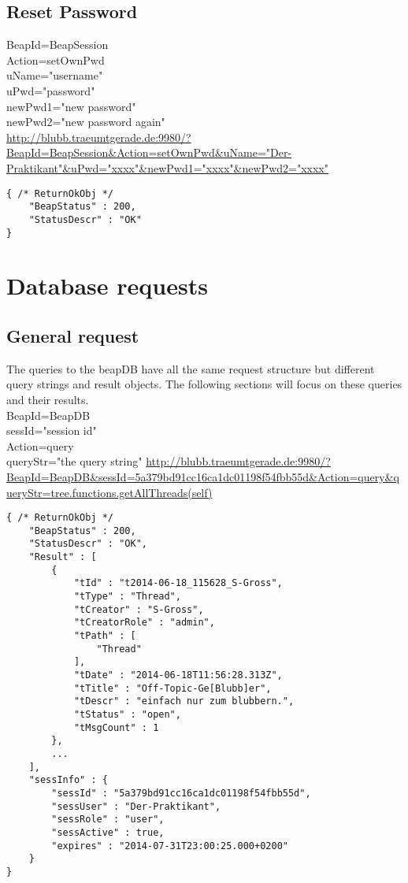 \documentclass[12pt,a4paper,oneside]{report}
\begin{document}
\subsection{Reset Password}

BeapId=BeapSession\\
Action=setOwnPwd\\
uName="username"\\
uPwd="password"\\
newPwd1="new password"\\
newPwd2="new password again"\\
\url{http://blubb.traeumtgerade.de:9980/?BeapId=BeapSession&Action=setOwnPwd&uName="Der-Praktikant"&uPwd="xxxx"&newPwd1="xxxx"&newPwd2="xxxx"}
\lstset{language=JavaScript}
\begin{lstlisting}
{ /* ReturnOkObj */
    "BeapStatus" : 200,
    "StatusDescr" : "OK"
}
\end{lstlisting}

\section{Database requests}
\subsection{General request}
The queries to the beapDB have all the same request structure but different query strings and result objects. The following sections will focus on these queries and their results.
\\
BeapId=BeapDB\\
sessId="session id"\\
Action=query\\
queryStr="the query string"
\url{http://blubb.traeumtgerade.de:9980/?BeapId=BeapDB&sessId=5a379bd91cc16ca1dc01198f54fbb55d&Action=query&queryStr=tree.functions.getAllThreads(self)}

\begin{lstlisting}
{ /* ReturnOkObj */
    "BeapStatus" : 200,
    "StatusDescr" : "OK",
    "Result" : [  
        { 
            "tId" : "t2014-06-18_115628_S-Gross",
            "tType" : "Thread",
            "tCreator" : "S-Gross",
            "tCreatorRole" : "admin",
            "tPath" : [  
                "Thread"
            ],
            "tDate" : "2014-06-18T11:56:28.313Z",
            "tTitle" : "Off-Topic-Ge[Blubb]er",
            "tDescr" : "einfach nur zum blubbern.",
            "tStatus" : "open",
            "tMsgCount" : 1
        },
        ...
    ],
    "sessInfo" : { 
        "sessId" : "5a379bd91cc16ca1dc01198f54fbb55d",
        "sessUser" : "Der-Praktikant",
        "sessRole" : "user",
        "sessActive" : true,
        "expires" : "2014-07-31T23:00:25.000+0200"
    }
}
\end{lstlisting}
\end{document}
